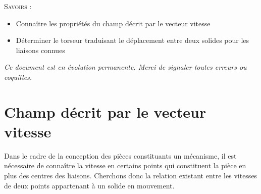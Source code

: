 \documentclass[11pt,oneside]{article}
\begin{document}
\begin{savoir}
\textsc{Savoirs :}
\begin{itemize}
\item Connaître les propriétés du champ décrit par le vecteur vitesse
\item Déterminer le torseur traduisant le déplacement entre deux solides pour les liaisons connues
\end{itemize}
\end{savoir}

\setlength{\parskip}{0ex plus 0.2ex minus 0ex}
 \renewcommand{\contentsname}{}
 \renewcommand{\baselinestretch}{1}

\textit{Ce document est en évolution permanente. Merci de signaler toutes
erreurs ou coquilles.}

\tableofcontents

 \renewcommand{\baselinestretch}{1.2}
\setlength{\parskip}{2ex plus 0.5ex minus 0.2ex}







\section{Champ décrit par le vecteur vitesse}
Dans le cadre de la conception des pièces constituants un mécanisme, il est nécessaire de connaître la vitesse en certains points qui constituent la pièce en plus des centres des liaisons. 
Cherchons donc la relation existant entre les vitesses de deux points appartenant à un solide en mouvement.
\end{document}
